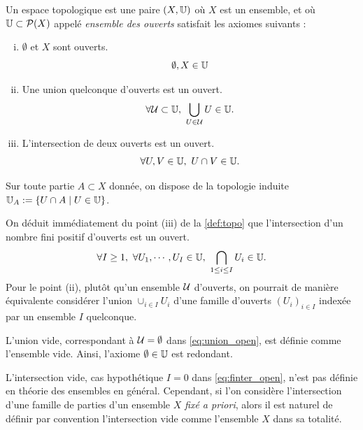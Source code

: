 \begin{definition}
\label{def:topo}
%
	Un espace topologique est une paire $(X, \mathbb{U})$ où $X$ est un ensemble, et où $\mathbb{U}\subset \mathcal{P}(X)$ appelé \emph{ensemble des ouverts} satisfait les axiomes suivants : 
	\begin{enumerate}[(i)]
		\item $\emptyset$ et $X$ sont ouverts.
		\begin{equation*}
			\emptyset, X \in \mathbb{U}
		\end{equation*}
		\item Une union quelconque d'ouverts est un ouvert. 
		\begin{equation*}
		\label{eq:union_open}
			\forall \mathcal{U} \subset \mathbb{U},\ \bigcup_{U \in \mathcal{U}} U \in \mathbb{U}.
		\end{equation*}
		\item L'intersection de deux ouverts est un ouvert.
		\begin{equation*}
		\label{eq:inter_open}
			\forall U,V \in \mathbb{U},\ U \cap V \in \mathbb{U}.
		\end{equation*}
	\end{enumerate}
Sur toute partie $A \subset X$ donnée, on dispose de la topologie induite $\mathbb{U}_A := \{U \cap A \mid U \in \mathbb{U}\}$. 
\end{definition}


On déduit immédiatement du point (iii) de la \cref{def:topo} que l'intersection d'un nombre fini positif d'ouverts est un ouvert. 
\begin{equation}
	\label{eq:finter_open}
	\forall I \geq 1,\ \forall U_1,\cdots,U_I \in \bU,\ \bigcap_{1 \leq i \leq I} U_i \in \bU.
\leancheck{eq:finter_open}%
\end{equation}
Pour le point (ii), plutôt qu'un ensemble $\mathcal{U}$ d'ouverts, on pourrait de manière équivalente considérer l'union $\cup_{i \in I} U_i$ d'une famille d'ouverts $(U_i)_{i \in I}$ indexée par un ensemble $I$ quelconque. 

\begin{remark}
\label{rem:unionVide}
%
L'union vide, correspondant à $\mathcal{U} = \emptyset$ dans \eqref{eq:union_open}, est définie comme l'ensemble vide. Ainsi, l'axiome $\emptyset \in \mathbb{U}$ est redondant. 

L'intersection vide, cas hypothétique $I=0$ dans \eqref{eq:finter_open}, n'est pas définie en théorie des ensembles en général.
Cependant, si l'on considère l'intersection d'une famille de parties d'un ensemble $X$ \emph{fixé a priori}, alors il est naturel de définir par convention l'intersection vide comme l'ensemble $X$ dans sa totalité.
\end{remark}

